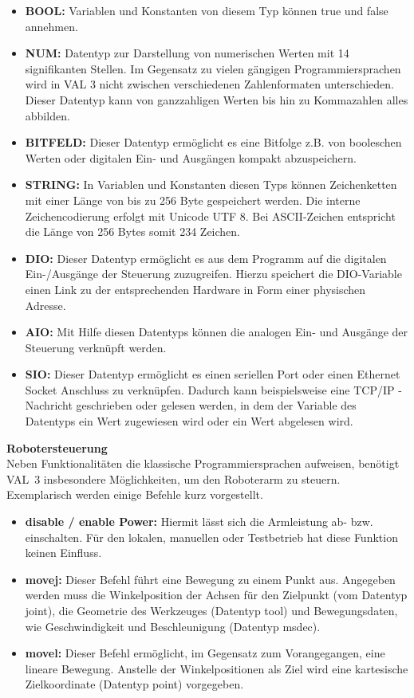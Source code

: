 \documentclass[ a4paper,
                oneside,
                toc=bibliography,
                toc=listof
                ]{scrbook}
\begin{document}
   	\begin{itemize}
   		\item \textbf{BOOL:} Variablen und Konstanten von diesem Typ können \glqq true\grqq{} und \glqq false\grqq{} annehmen.
   		\item \textbf{NUM:} Datentyp zur Darstellung von numerischen Werten mit 14 signifikanten Stellen. Im Gegensatz zu vielen gängigen Programmiersprachen wird in VAL 3 nicht zwischen verschiedenen Zahlenformaten unterschieden. Dieser Datentyp kann von ganzzahligen Werten bis hin zu Kommazahlen alles abbilden.
   		\item \textbf{BITFELD:} Dieser Datentyp ermöglicht es eine Bitfolge z.B. von booleschen Werten oder digitalen Ein- und Ausgängen kompakt abzuspeichern.
   		\item \textbf{STRING:} In Variablen und Konstanten diesen Typs können Zeichenketten mit einer Länge von bis zu 256 Byte gespeichert werden. Die interne Zeichencodierung erfolgt mit Unicode UTF 8. Bei ASCII-Zeichen entspricht die Länge von 256 Bytes somit 234 Zeichen.
   		\item \textbf{DIO:} Dieser Datentyp ermöglicht es aus dem Programm auf die digitalen Ein-/Ausgänge der Steuerung zuzugreifen. Hierzu speichert die DIO-Variable einen Link zu der entsprechenden Hardware in Form einer physischen Adresse.
   		\item \textbf{AIO:} Mit Hilfe diesen Datentyps können die analogen Ein- und Ausgänge der Steuerung verknüpft werden.
   		\item \textbf{SIO:} Dieser Datentyp ermöglicht es einen seriellen Port oder einen Ethernet Socket Anschluss zu verknüpfen. Dadurch kann beispielsweise eine TCP/IP - Nachricht geschrieben oder gelesen werden, in dem der Variable des Datentyps ein Wert zugewiesen wird oder ein Wert abgelesen wird. \\
   	\end{itemize} \vspace{-15pt}
   	\textbf{Robotersteuerung}\\
   	Neben Funktionalitäten die klassische Programmiersprachen aufweisen, benötigt VAL~3 insbesondere Möglichkeiten, um den Roboterarm zu steuern. Exemplarisch werden einige Befehle kurz vorgestellt.
   	\begin{itemize}
   		\item \textbf{disable / enable Power:} Hiermit lässt sich die Armleistung ab- bzw. einschalten. Für den lokalen, manuellen oder Testbetrieb hat diese Funktion keinen Einfluss.
   		\item \textbf{movej:} Dieser Befehl führt eine Bewegung zu einem Punkt aus. Angegeben werden muss die Winkelposition der Achsen für den Zielpunkt (vom Datentyp \glqq joint\grqq), die Geometrie des Werkzeuges (Datentyp \glqq tool\grqq) und Bewegungsdaten, wie Geschwindigkeit und Beschleunigung (Datentyp \glqq msdec\grqq).
   		\item \textbf{movel:} Dieser Befehl ermöglicht, im Gegensatz zum Vorangegangen, eine lineare Bewegung. Anstelle der Winkelpositionen als Ziel wird eine kartesische Zielkoordinate (Datentyp \glqq point\grqq) vorgegeben.  \\
   	\end{itemize}
\end{document}
